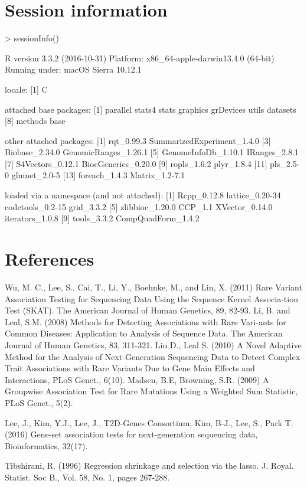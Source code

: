 \documentclass{article}
\begin{document}
\section{Session information}
\begin{Schunk}
\begin{Sinput}
> sessionInfo()
\end{Sinput}
\begin{Soutput}
R version 3.3.2 (2016-10-31)
Platform: x86_64-apple-darwin13.4.0 (64-bit)
Running under: macOS Sierra 10.12.1

locale:
[1] C

attached base packages:
[1] parallel  stats4    stats     graphics  grDevices utils     datasets 
[8] methods   base     

other attached packages:
 [1] rqt_0.99.3                 SummarizedExperiment_1.4.0
 [3] Biobase_2.34.0             GenomicRanges_1.26.1      
 [5] GenomeInfoDb_1.10.1        IRanges_2.8.1             
 [7] S4Vectors_0.12.1           BiocGenerics_0.20.0       
 [9] ropls_1.6.2                plyr_1.8.4                
[11] pls_2.5-0                  glmnet_2.0-5              
[13] foreach_1.4.3              Matrix_1.2-7.1            

loaded via a namespace (and not attached):
 [1] Rcpp_0.12.8        lattice_0.20-34    codetools_0.2-15   grid_3.3.2        
 [5] zlibbioc_1.20.0    CCP_1.1            XVector_0.14.0     iterators_1.0.8   
 [9] tools_3.3.2        CompQuadForm_1.4.2
\end{Soutput}
\end{Schunk}
\clearpage
\section{References}
\begin{thebibliography}{00}

 Wu, M. C., Lee, S., Cai, T., Li, Y., Boehnke, M., 
and Lin, X. (2011) 
Rare Variant Association Testing for Sequencing Data Using the Sequence 
Kernel Associa-tion Test (SKAT). The American Journal of 
Human Genetics, 89, 82-93.
 Li, B. and Leal, S.M. (2008) Methods for 
Detecting Associations 
with Rare Vari-ants for Common Diseases: Application to Analysis 
of Sequence Data. The American Journal of Human Genetics, 83, 311-321.
 Liu D., Leal S. (2010) A Novel Adaptive Method for 
the Analysis 
of Next-Generation Sequencing Data to Detect Complex Trait 
Associations with Rare Variants Due to Gene Main Effects and 
Interactions, PLoS Genet., 6(10).
 Madsen, B.E, Browning, S.R. (2009) 
A Groupwise Association 
Test for Rare Mutations Using a Weighted Sum Statistic, PLoS Genet., 5(2).

 Lee, J., Kim, Y.J., Lee, J., T2D-Genes Consortium, 
Kim, B-J., 
Lee, S., Park T. (2016) Gene-set association tests for 
next-generation sequencing data, Bioinformatics, 32(17).

 Tibshirani, R. (1996) Regression shrinkage 
and selection 
via the lasso. J. Royal. Statist. Soc B., Vol. 58, No. 1, pages 267-288.
\end{thebibliography}
\end{document}

